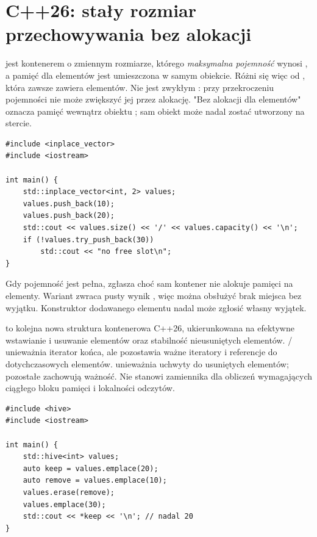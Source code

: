 \section{C++26: stały rozmiar przechowywania bez alokacji}
\label{sec:cpp21-inplace}

 jest kontenerem o zmiennym rozmiarze,
którego \emph{maksymalna pojemność} wynosi , a pamięć dla
elementów jest umieszczona w samym obiekcie. Różni się więc od
, która zawsze zawiera  elementów.
Nie jest zwykłym : przy przekroczeniu pojemności
nie może zwiększyć jej przez alokację.
"Bez alokacji dla elementów" oznacza pamięć wewnątrz obiektu
; sam obiekt może nadal zostać utworzony na stercie.

\begin{lstlisting}[caption={Kontener inplace\_vector (C++26; wymagane wsparcie biblioteki).}]
#include <inplace_vector>
#include <iostream>

int main() {
    std::inplace_vector<int, 2> values;
    values.push_back(10);
    values.push_back(20);
    std::cout << values.size() << '/' << values.capacity() << '\n';
    if (!values.try_push_back(30))
        std::cout << "no free slot\n";
}
\end{lstlisting}

Gdy pojemność jest pełna,  zgłasza 
choć sam kontener nie alokuje pamięci na elementy. Wariant
 zwraca pusty wynik , więc można
obsłużyć brak miejsca bez wyjątku. Konstruktor dodawanego elementu
nadal może zgłosić własny wyjątek.

 to kolejna nowa struktura kontenerowa C++26,
ukierunkowana na efektywne wstawianie i usuwanie elementów oraz
stabilność nieusuniętych elementów. /
unieważnia iterator końca, ale pozostawia ważne iteratory i referencje
do dotychczasowych elementów.  unieważnia uchwyty do
usuniętych elementów; pozostałe zachowują ważność.
Nie stanowi zamiennika  dla obliczeń wymagających
ciągłego bloku pamięci i lokalności odczytów.

\begin{lstlisting}[caption={Iterator do nieusunietego elementu hive pozostaje poprawny (C++26).}]
#include <hive>
#include <iostream>

int main() {
    std::hive<int> values;
    auto keep = values.emplace(20);
    auto remove = values.emplace(10);
    values.erase(remove);
    values.emplace(30);
    std::cout << *keep << '\n'; // nadal 20
}
\end{lstlisting}

